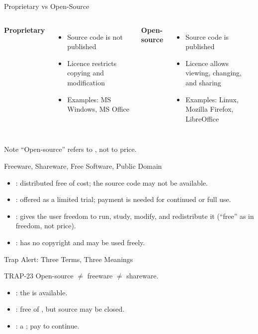 \documentclass[aspectratio=169]{beamer}
\begin{document}
\begin{frame}{Proprietary vs Open-Source}
  \begin{columns}[T]
      \textbf{Proprietary}
      \begin{itemize}
        \item Source code is not published
        \item Licence restricts copying and modification
        \item Examples: MS Windows, MS Office
      \end{itemize}
      \textbf{Open-source}
      \begin{itemize}
        \item Source code is published
        \item Licence allows viewing, changing, and sharing
        \item Examples: Linux, Mozilla Firefox, LibreOffice
      \end{itemize}
  \end{columns}
  \vspace{0.3cm}
  \begin{alertblock}{Note}
    ``Open-source'' refers to , not to price.
  \end{alertblock}
\end{frame}

\begin{frame}{Freeware, Shareware, Free Software, Public Domain}
  \begin{itemize}
    \item {}: distributed free of cost; the source code may not
      be available.
    \item {}: offered as a limited trial; payment is needed for
      continued or full use.
    \item {}: gives the user freedom to run, study, modify,
      and redistribute it (``free'' as in freedom, not price).
    \item {}: has no copyright and may be used
      freely.
  \end{itemize}
\end{frame}

\begin{frame}{Trap Alert: Three Terms, Three Meanings}
  \begin{alertblock}{TRAP-23}
    Open-source $\neq$ freeware $\neq$ shareware.
  \end{alertblock}
  \begin{itemize}
    \item {}: the  is available.
    \item {}: free of , but source may be closed.
    \item {}: a ; pay to continue.
  \end{itemize}
  \vspace{0.2cm}
\end{frame}
\end{document}

